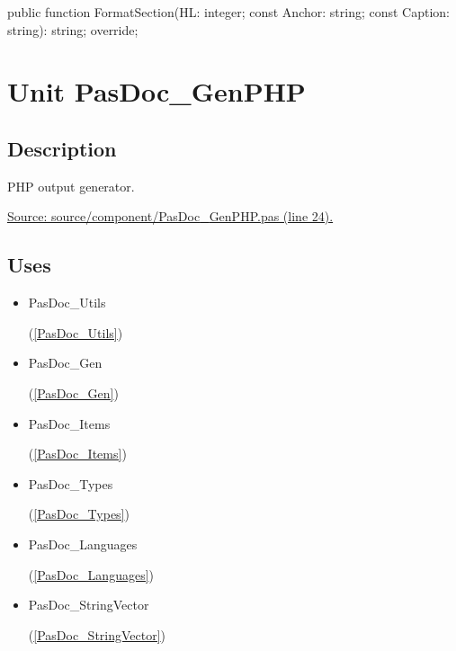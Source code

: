 \documentclass{report}
\newif\ifpdf
\begin{document}
\label{PasDoc_GenLatex.TTexDocGenerator-FormatSection}
\begin{list}{}{
\setlength{\itemindent}{0cm}
\setlength{\listparindent}{0cm}
\setlength{\leftmargin}{\evensidemargin}
\addtolength{\leftmargin}{\tmplength}
\settowidth{\labelsep}{X}
\addtolength{\leftmargin}{\labelsep}
\setlength{\labelwidth}{\tmplength}
}
\item[\textbf{Declaration}\hfill]
\ifpdf
\begin{flushleft}
\fi
\begin{ttfamily}
public function FormatSection(HL: integer; const Anchor: string; const Caption: string): string; override;\end{ttfamily}

\ifpdf
\end{flushleft}
\fi

\end{list}
\chapter{Unit PasDoc{\_}GenPHP}
\label{PasDoc_GenPHP}
\section{Description}
PHP output generator.\par
\href{https://github.com/pasdoc/pasdoc/blob/master/source/component/PasDoc_GenPHP.pas#L24}{Source: source/component/PasDoc{\_}GenPHP.pas (line 24).}
\section{Uses}
\begin{itemize}
\item \begin{ttfamily}PasDoc{\_}Utils\end{ttfamily}(\ref{PasDoc_Utils})\item \begin{ttfamily}PasDoc{\_}Gen\end{ttfamily}(\ref{PasDoc_Gen})\item \begin{ttfamily}PasDoc{\_}Items\end{ttfamily}(\ref{PasDoc_Items})\item \begin{ttfamily}PasDoc{\_}Types\end{ttfamily}(\ref{PasDoc_Types})\item \begin{ttfamily}PasDoc{\_}Languages\end{ttfamily}(\ref{PasDoc_Languages})\item \begin{ttfamily}PasDoc{\_}StringVector\end{ttfamily}(\ref{PasDoc_StringVector})\end{itemize}
\end{document}
